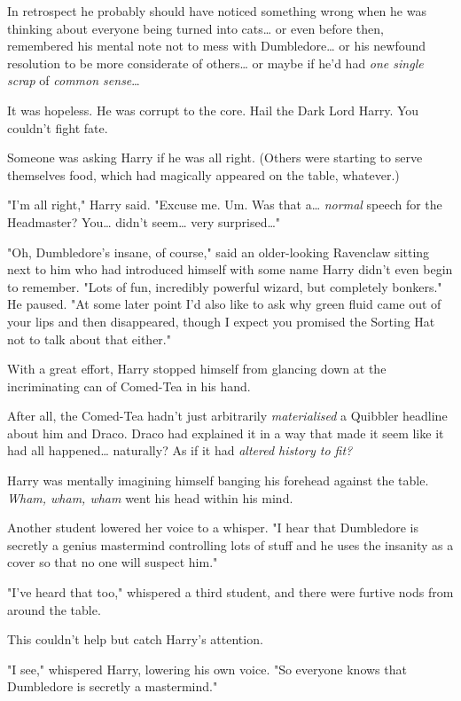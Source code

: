 In retrospect he probably should have noticed something wrong when he was
thinking about everyone being turned into cats{\ldots} or even before then,
remembered his mental note not to mess with Dumbledore{\ldots} or his newfound
resolution to be more considerate of others{\ldots} or maybe if he'd had
\emph{one single scrap} of \emph{common sense}{\ldots}

It was hopeless. He was corrupt to the core. Hail the Dark Lord Harry. You
couldn't fight fate.

Someone was asking Harry if he was all right. (Others were starting to serve
themselves food, which had magically appeared on the table, whatever.)

"I'm all right," Harry said. "Excuse me. Um. Was that a{\ldots} \emph{normal}
speech for the Headmaster? You{\ldots} didn't seem{\ldots} very
surprised{\ldots}"

"Oh, Dumbledore's insane, of course," said an older-looking Ravenclaw sitting
next to him who had introduced himself with some name Harry didn't even begin
to remember. "Lots of fun, incredibly powerful wizard, but completely bonkers."
He paused. "At some later point I'd also like to ask why green fluid came out
of your lips and then disappeared, though I expect you promised the Sorting Hat
not to talk about that either."

With a great effort, Harry stopped himself from glancing down at the
incriminating can of Comed-Tea in his hand.

After all, the Comed-Tea hadn't just arbitrarily \emph{materialised} a Quibbler
headline about him and Draco. Draco had explained it in a way that made it seem
like it had all happened{\ldots} naturally? As if it had \emph{altered history
to fit?}

Harry was mentally imagining himself banging his forehead against the table.
\emph{Wham, wham, wham} went his head within his mind.

Another student lowered her voice to a whisper. "I hear that Dumbledore is
secretly a genius mastermind controlling lots of stuff and he uses the insanity
as a cover so that no one will suspect him."

"I've heard that too," whispered a third student, and there were furtive nods
from around the table.

This couldn't help but catch Harry's attention.

"I see," whispered Harry, lowering his own voice. "So everyone knows that
Dumbledore is secretly a mastermind."

